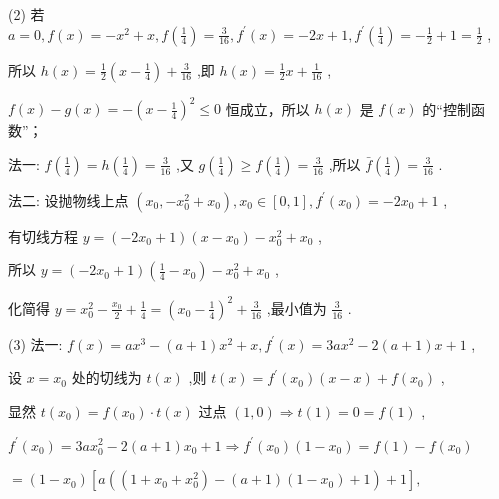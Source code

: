 \documentclass[10pt]{article}
\begin{document}
(2) 若 \(a = 0,f\left( x\right)  =  - {x}^{2} + x,f\left( \frac{1}{4}\right)  = \frac{3}{16},{f}^{\prime }\left( x\right)  =  - {2x} + 1,{f}^{\prime }\left( \frac{1}{4}\right)  =  - \frac{1}{2} + 1 = \frac{1}{2}\) ,

所以 \(h\left( x\right)  = \frac{1}{2}\left( {x - \frac{1}{4}}\right)  + \frac{3}{16}\) ,即 \(h\left( x\right)  = \frac{1}{2}x + \frac{1}{16}\) ,

\(f\left( x\right)  - g\left( x\right)  =  - {\left( x - \frac{1}{4}\right) }^{2} \leq  0\) 恒成立，所以 \(h\left( x\right)\) 是 \(f\left( x\right)\) 的“控制函数”；

法一: \(f\left( \frac{1}{4}\right)  = h\left( \frac{1}{4}\right)  = \frac{3}{16}\) ,又 \(g\left( \frac{1}{4}\right)  \geq  f\left( \frac{1}{4}\right)  = \frac{3}{16}\) ,所以 \(\bar{f}\left( \frac{1}{4}\right)  = \frac{3}{16}\) .

法二: 设抛物线上点 \(\left( {{x}_{0}, - {x}_{0}^{2} + {x}_{0}}\right) ,{x}_{0} \in  \left\lbrack  {0,1}\right\rbrack  ,{f}^{\prime }\left( {x}_{0}\right)  =  - 2{x}_{0} + 1\) ,

有切线方程 \(y = \left( {-2{x}_{0} + 1}\right) \left( {x - {x}_{0}}\right)  - {x}_{0}^{2} + {x}_{0}\) ,

所以 \(y = \left( {-2{x}_{0} + 1}\right) \left( {\frac{1}{4} - {x}_{0}}\right)  - {x}_{0}^{2} + {x}_{0}\) ,

化简得 \(y = {x}_{0}^{2} - \frac{{x}_{0}}{2} + \frac{1}{4} = {\left( {x}_{0} - \frac{1}{4}\right) }^{2} + \frac{3}{16}\) ,最小值为 \(\frac{3}{16}\) .

(3) 法一: \(f\left( x\right)  = a{x}^{3} - \left( {a + 1}\right) {x}^{2} + x,{f}^{\prime }\left( x\right)  = {3a}{x}^{2} - 2\left( {a + 1}\right) x + 1\) ,

设 \(x = {x}_{0}\) 处的切线为 \(t\left( x\right)\) ,则 \(t\left( x\right)  = {f}^{\prime }\left( {x}_{0}\right) \left( {x - x}\right)  + f\left( {x}_{0}\right)\) ,

显然 \(t\left( {x}_{0}\right)  = f\left( {x}_{0}\right)  \cdot  t\left( x\right)\) 过点 \(\left( {1,0}\right)  \Rightarrow  t\left( 1\right)  = 0 = f\left( 1\right)\) ,

\({f}^{\prime }\left( {x}_{0}\right)  = {3a}{x}_{0}^{2} - 2\left( {a + 1}\right) {x}_{0} + 1 \Rightarrow  {f}^{\prime }\left( {x}_{0}\right) \left( {1 - {x}_{0}}\right)  = f\left( 1\right)  - f\left( {x}_{0}\right)\)

\(= \left( {1 - {x}_{0}}\right) \left\lbrack  {a\left( {\left( {1 + {x}_{0} + {x}_{0}^{2}}\right)  - \left( {a + 1}\right) \left( {1 - {x}_{0}}\right)  + 1}\right)  + 1}\right\rbrack  ,\)
\end{document}
